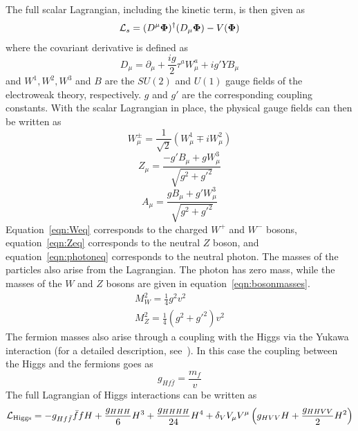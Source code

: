 %
The full scalar Lagrangian, including the kinetic term, is then given as 
%
\begin{equation}
\mathcal{L}_s = (D^\mu \mathbf{\Phi})^\dagger(D_\mu\mathbf{\Phi}) - V(\mathbf{\Phi})
\end{equation}
%
where the covariant derivative is defined as 
%
\begin{equation}
D_\mu = \partial_\mu + \frac{ig}{2}\tau^aW_\mu^a + ig'YB_\mu
\end{equation}
%
and $W^1, W^2, W^3$ and $B$ are the $SU(2)$ and $U(1)$ gauge fields of the electroweak theory, respectively. $g$ and $g'$ are the corresponding coupling constants. With the scalar Lagrangian in place, the physical gauge fields can then be written as 
%
\begin{equation}
\label{eqn:Weq}
W_\mu^\pm = \frac{1}{\sqrt{2}}(W_\mu^1 \mp iW_\mu^2) 
\end{equation}
%
\begin{equation}
\label{eqn:Zeq}
Z_\mu = \frac{-g'B_\mu + gW_\mu^3}{\sqrt{g^2 + g'^2}} 
\end{equation}
%
\begin{equation}
\label{eqn:photoneq}
A_\mu = \frac{gB_\mu + g'W_\mu^3}{\sqrt{g^2 + g'^2}}
\end{equation}
%
Equation~\ref{eqn:Weq} corresponds to the charged $W^+$ and $W^-$ bosons, equation~\ref{eqn:Zeq} corresponds to the neutral $Z$ boson, and equation~\ref{eqn:photoneq} corresponds to the neutral photon. The masses of the particles also arise from the Lagrangian. The photon has zero mass, while the masses of the $W$ and $Z$ bosons are given in equation~\ref{eqn:bosonmasses}.
%
\begin{equation}
\label{eqn:bosonmasses}
\begin{array}{c}
M_W^2 = \frac{1}{4}g^2v^2 \\ 
M_Z^2 = \frac{1}{4}(g^2 + g'^2)v^2
\end{array}
\end{equation}
%
The fermion masses also arise through a coupling with the Higgs via the Yukawa interaction (for a detailed description, see~\cite{Dawson}). In this case the coupling between the Higgs and the fermions goes as 
%
\begin{equation}
\label{eqn:higgs-fermions}
g_{Hf\bar{f}} = \frac{m_f}{v}
\end{equation} 
%
The full Lagrangian of Higgs interactions can be written as 
%
\begin{equation}
\mathcal{L}_{\rm Higgs} = -g_{Hf\bar{f}}\bar{f}fH + \frac{g_{HHH}}{6}H^3 + \frac{g_{HHHH}}{24}H^4 + \delta_V V_\mu V^\mu\left(g_{HVV} H + \frac{g_{HHVV}}{2}H^2\right)
\end{equation}
